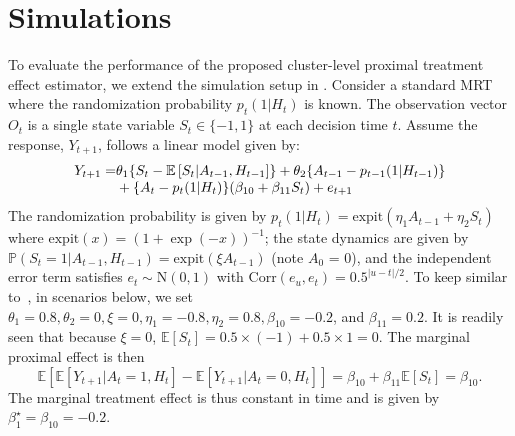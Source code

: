\documentclass[12pt]{article}
\def\E{\mathbb{E}}
\newcommand{\zw}[1]{\textcolor{blue}{[\textit{ZW: #1}]}}
\begin{document}





\section{Simulations}
\label{section:sims}

To evaluate the performance of the proposed cluster-level proximal treatment effect estimator, we extend the simulation setup in \cite{Boruvkaetal}. Consider a standard MRT where the randomization probability $p_t(1|H_t)$ is known. The observation vector $O_t$ is a single state variable $S_t \in \{-1,1\}$ at each decision time $t$. Assume the response, $Y_{t+1}$, follows a linear model given by:
\begin{equation}
\label{eq:generativemodel}
\begin{array}{r@{}l}
    Y_{t+1} = &{} \theta_1 \{S_t - \E \left[ S_t|A_{t-1},H_{t-1}\right]\} + \theta_2\{A_{t-1}-p_{t-1}(1|H_{t-1})\} \\
    &{}+ \{A_t - p_t(1|H_t)\}(\beta_{10} + \beta_{11} S_t)+  e_{t+1}
\end{array}
\end{equation}
The randomization probability is given by $p_t(1|H_t) = \text{expit}(\eta_1 A_{t-1}+\eta_2 S_t)$ where $\text{expit}(x)=(1+\exp(-x))^{-1}$; the state dynamics are given by $\mathbb{P}(S_t=1|A_{t-1},H_{t-1})=\text{expit}(\xi A_{t-1})$ (note $A_0$ = 0), and the independent error term satisfies $e_t \sim \text{N}(0,1)$ with $\text{Corr}(e_u, e_t) = 0.5^{|u-t|/2}$. To keep similar to~\cite{Boruvkaetal}, in scenarios below, we set $\theta_1=0.8, \theta_2 = 0, \xi=0, \eta_1 = -0.8, \eta_2 = 0.8, \beta_{10}=-0.2$, and $\beta_{11} = 0.2$. It is readily seen that because $\xi=0$, $\E \left[S_t \right]=0.5\times (-1) +0.5\times 1=0$. The marginal proximal effect is then
$$
\E \left[ \E \left[Y_{t+1}|A_{t}=1,H_t \right] - \E \left[Y_{t+1}|A_t=0,H_t \right] \right] = \beta_{10} + \beta_{11} \E \left[S_t \right]=\beta_{10}.
$$
The marginal treatment effect is thus constant in time and is given by $\beta_1^\star = \beta_{10} =  -0.2$.
\end{document}
